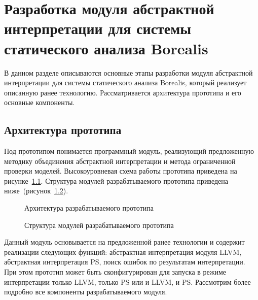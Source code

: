 \chapter{Разработка модуля абстрактной интерпретации для системы статического
анализа Borealis}
\label{chapter:implementation}
В данном разделе описываются основные этапы разработки модуля абстрактной 
интерпретации для системы статического анализа Borealis, который реализует
описанную ранее технологию. Рассматривается архитектура прототипа и его
основные компоненты.

\section{Архитектура прототипа}
Под прототипом понимается программный модуль, реализующий предложенную методику
объединения абстрактной интерпретации и метода ограниченной проверки моделей.
Высокоуровневая схема работы прототипа приведена на 
рисунке~\ref{image:NewBorealisOverview}. Структура модулей разрабатываемого
прототипа приведена ниже~(рисунок~\ref{image:prototypeArchitecture}).
\begin{figure}[h!]
\caption{Архитектура разрабатываемого прототипа}
\label{image:NewBorealisOverview}
\end{figure}
\begin{figure}[h!]
\caption{Структура модулей разрабатываемого прототипа}
\label{image:prototypeArchitecture}
\end{figure}

Данный модуль основывается на предложенной ранее технологии и содержит 
реализации следующих функций: абстрактная интерпретация модуля LLVM, 
абстрактная интерпретация PS, поиск ошибок по результатам интерпретации. 
При этом прототип может быть сконфигурирован для запуска в режиме интерпретации
только LLVM, только PS или и LLVM, и PS. Рассмотрим более подробно все 
компоненты разрабатываемого модуля.


